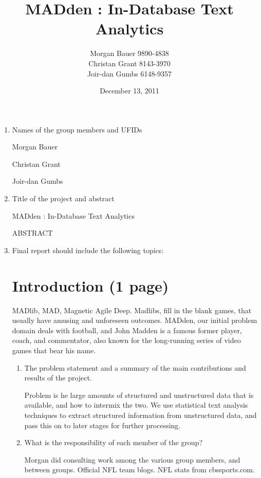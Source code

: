 \documentclass{article}
\title{MADden : In-Database Text Analytics}
\author{Morgan Bauer 9890-4838 \\
  Christan Grant 8143-3970 \\
  Joir-dan Gumbs 6148-9357}
\date{December 13, 2011}
\begin{document}
\maketitle
\begin{enumerate}
\item Names of the group members and UFIDs


  Morgan Bauer

  Christan Grant

  Joir-dan Gumbs

\item Title of the project and abstract

  MADden : In-Database Text Analytics

  ABSTRACT



\item Final report should include the following topics:

  \section{Introduction (1 page)}

  MADlib, MAD, Magnetic Agile Deep.
  Madlibs, fill in the blank games, that usually have amusing and unforeseen outcomes.
  MADden, our initial problem domain deals with football,
  and John Madden is a famous former player, coach, and commentator,
  also known for the long-running series of video games that bear his name.

  \begin{enumerate}
  \item The problem statement and a summary of the main contributions and results of the project.

    Problem is he large amounts of structured and unstructured data that is available, and how to intermix the two.
    We use statistical text analysis techniques to extract structured information from unstructured data,
    and pass this on to later stages for further processing.

  \item What is the responsibility of each member of the group?



    Morgan did consulting work among the various group members, and between groups.
    Official NFL team blogs. NFL stats from cbssports.com.
  \end{enumerate}


\end{enumerate}
\end{document}
